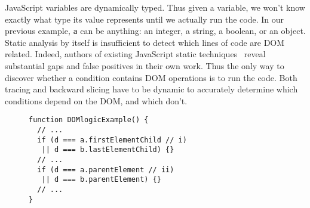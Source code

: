 JavaScript variables are dynamically typed.  Thus given a variable, we won't know exactly what type its value represents until we actually run the code.  
In our previous example, {\tt a} can be anything: an integer, a string, a boolean, or an object.  
Static analysis by itself is insufficient to detect which lines of code are DOM related.
Indeed, authors of existing JavaScript static techniques~\cite{staticJsWWW09, staticJsWWW11} reveal substantial gaps and false positives in their own work.  
Thus the only way to discover whether a condition contains DOM operations is to run the code.  Both tracing and backward slicing have to be dynamic to accurately determine which conditions depend on the DOM, and which don't.  



\begin{figure}
\begin{lstlisting}[caption=Example code showing conditions that have logical constraints interdependent with each other.,label=domOr]  
function DOMlogicExample() {
  // ...
  if (d === a.firstElementChild // i)
   || d === b.lastElementChild) {}
  // ... 
  if (d === a.parentElement // ii)
   || d === b.parentElement) {}
  // ...
}
\end{lstlisting}
\end{figure}

